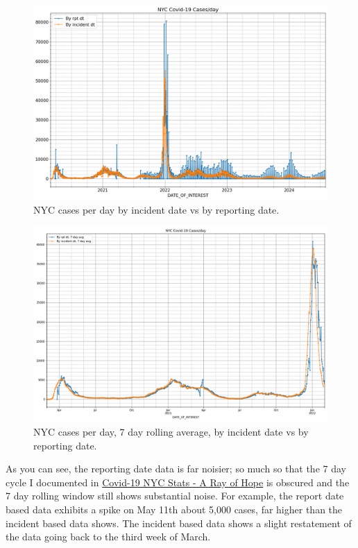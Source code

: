 \documentclass[10pt,reqno]{amsart}
\begin{document}
\begin{figure}[H]
  \centering
  \includegraphics[width=\textwidth]{../Notebooks/casesPerDayHistoryRptDtVsInDtRaw.png}
  \caption{NYC cases per day by incident date vs by reporting date.}
  \label{fig:rptvsdataraw}
\end{figure}

\begin{figure}[H]
  \centering
  \includegraphics[width=\textwidth]{../Notebooks/casesPerDayHistoryRptDtVsInDt.png}
  \caption{NYC cases per day, 7 day rolling average, by incident date vs by reporting date.}
  \label{fig:rptvsdata7day}
\end{figure}

As you can see, the reporting date data is far noisier; so much so
that the 7 day cycle I documented in
\href{https://hjstein.blogspot.com/2020/04/covid-19-nyc-stats-ray-of-hope.html}{Covid-19
  NYC Stats - A Ray of Hope} is obscured and the 7 day rolling window
still shows substantial noise.  For example, the report date based
data exhibits a spike on May 11th about 5,000 cases, far higher than
the incident based data shows.  The incident based data shows a slight
restatement of the data going back to the third week of March.
\end{document}
